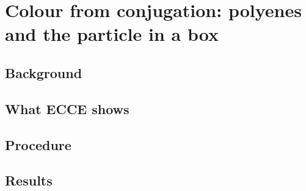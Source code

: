 \chapter{Colour from conjugation: polyenes and the particle in a box}
\label{ch:colour}


\section{Background}

\section{What ECCE shows}

\section{Procedure}

\section{Results}

